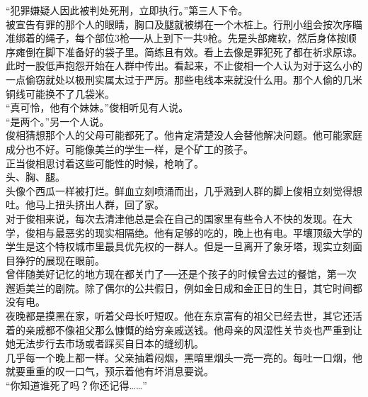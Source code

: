 “犯罪嫌疑人因此被判处死刑，立即执行。”第三人下令。\\

被宣告有罪的那个人的眼睛，胸口及腿就被绑在一个木桩上。行刑小组会按次序瞄准绑着的绳子，每个部位3枪──从上到下一共9枪。先是头部瘫软，然后身体按顺序瘫倒在脚下准备好的袋子里。简练且有效。看上去像是罪犯死了都在祈求原谅。\\

此时一股低声抱怨开始在人群中传出。看起来，不止俊相一个人认为对于这么小的一点偷窃就处以极刑实属太过于严厉。那些电线本来就没什么用。那个人偷的几米铜线可能换不了几袋米。\\

“真可怜，他有个妹妹。”俊相听见有人说。\\

“是两个。”另一个人说。\\

俊相猜想那个人的父母可能都死了。他肯定清楚没人会替他解决问题。他可能家庭成分也不好。可能像美兰的学生一样，是个矿工的孩子。\\

正当俊相思讨着这些可能性的时候，枪响了。\\

头、胸、腿。\\

头像个西瓜一样被打烂。鲜血立刻喷涌而出，几乎溅到人群的脚上俊相立刻觉得想吐。他马上扭头挤出人群，回了家。\\

对于俊相来说，每次去清津他总是会在自己的国家里有些令人不快的发现。在大学，俊相与最恶劣的现实相隔绝。他有足够的吃的，晚上也有电。平壤顶级大学的学生是这个特权城市里最具优先权的一群人。但是一旦离开了象牙塔，现实立刻面目狰狞的展现在眼前。\\

曾伴随美好记忆的地方现在都关门了──还是个孩子的时候曾去过的餐馆，第一次邂逅美兰的剧院。除了偶尔的公共假日，例如金日成和金正日的生日，其它时间都没有电。\\

夜晚都是摸黑在家，听着父母长吁短叹。他在东京富有的祖父已经去世，其它还活着的亲戚都不像祖父那么慷慨的给穷亲戚送钱。他母亲的风湿性关节炎也严重到让她无法步行去市场或者踩买自日本的缝纫机。\\

几乎每一个晚上都一样。父亲抽着闷烟，黑暗里烟头一亮一亮的。每吐一口烟，他就要重重的叹一口气，预示着他有坏消息要说。\\

“你知道谁死了吗？你还记得……”\\


